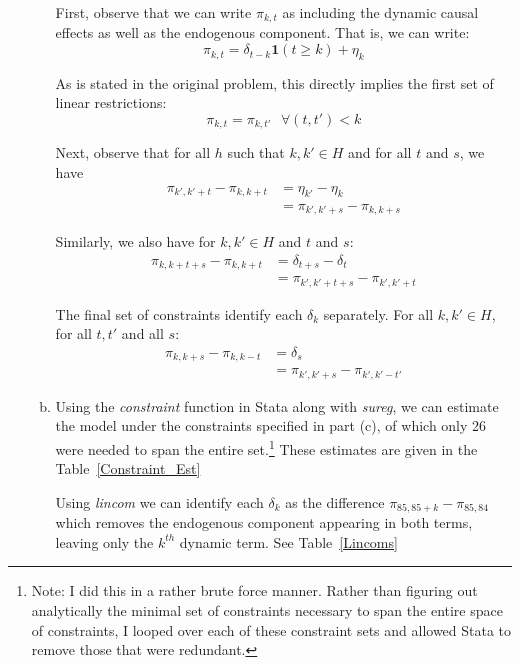 \documentclass[11pt]{article}
\begin{document}
\begin{enumerate}[1)]
\begin{enumerate}[(a)]
		First, observe that we can write $\pi_{k,t}$ as including the dynamic causal effects as well as the endogenous component. That is, we can write:
		\[\pi_{k,t} = \delta_{t-k}\mathbf{1}(t \geq k) + \eta_k \]

		As is stated in the original problem, this directly implies the first set of linear restrictions:
		\[\pi_{k,t} = \pi_{k,t'} \mbox{ } \forall (t,t') < k\]

		Next, observe that for all $h$ such that $k, k' \in H$ and for all $t$ and $s$, we have
		\begin{align*}
			\pi_{k',k'+t} - \pi_{k,k+t} & = \eta_{k'} - \eta_{k} \\
			& = \pi_{k',k'+s} - \pi_{k,k+s}
		\end{align*}

		Similarly, we also have for $k,k'\in H$ and $t$ and $s$:
		\begin{align*}
			\pi_{k,k+t+s} - \pi_{k,k+t} & = \delta_{t+s} - \delta_{t} \\
            & = \pi_{k',k'+t+s} - \pi_{k',k'+t}
		\end{align*}

		The final set of constraints identify each $\delta_k$ separately. For all $k,k' \in H$, for all $t,t'$ and all $s$:
		\begin{align*}
			\pi_{k,k+s} - \pi_{k,k-t} & = \delta_{s} \\
			& = \pi_{k',k'+s} - \pi_{k',k'-t'}
		\end{align*}

		\item Using the \textit{constraint} function in Stata along with \textit{sureg}, we can estimate the model under the constraints specified in part (c), of which only 26 were needed to span the entire set.\footnote{Note: I did this in a rather brute force manner. Rather than figuring out analytically the minimal set of constraints necessary to span the entire space of constraints, I looped over each of these constraint sets and allowed Stata to remove those that were redundant.} These estimates are given in the Table~\ref{Constraint_Est}

		Using \textit{lincom} we can identify each $\delta_k$ as the difference $\pi_{85,85+k}-\pi_{85,84}$ which removes the endogenous component appearing in both terms, leaving only the $k^{th}$ dynamic term. See Table~\ref{Lincoms}
		
	\end{enumerate}
\end{enumerate}
\end{document}

